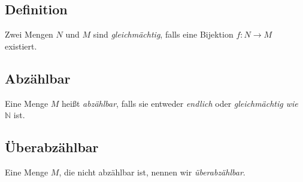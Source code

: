 \documentclass{scrreprt}
\newcommand{\NN}{\mathbb{N}}
\begin{document}
		\subsection{Definition}
		Zwei Mengen $N$ und $M$ sind \emph{gleichmächtig}, falls eine Bijektion $f: N \longrightarrow M$ existiert.
		\subsection{Abzählbar}
		Eine Menge $M$ heißt \emph{abzählbar}, falls sie entweder \emph{endlich} oder \emph{gleichmächtig wie $\NN$} ist.
		\subsection{Überabzählbar}
		Eine Menge $M$, die nicht abzählbar ist, nennen wir \emph{überabzählbar}.
\end{document}
